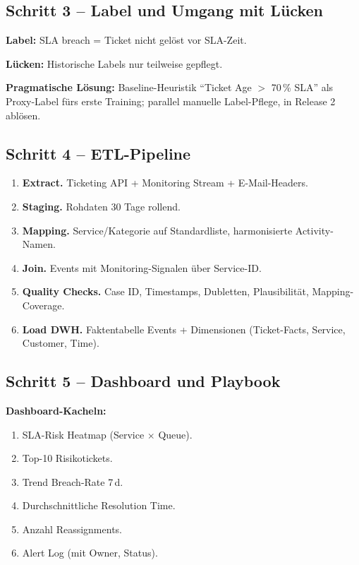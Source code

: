 \documentclass[11pt,a4paper,oneside]{article}
\begin{document}
\subsection{Schritt 3 -- Label und Umgang mit Lücken}

\textbf{Label:} SLA breach = Ticket nicht gelöst vor SLA-Zeit.

\textbf{Lücken:} Historische Labels nur teilweise gepflegt.

\textbf{Pragmatische Lösung:} Baseline-Heuristik ``Ticket Age $>$ 70\,\% SLA'' als Proxy-Label fürs erste Training; parallel manuelle Label-Pflege, in Release 2 ablösen.

\subsection{Schritt 4 -- ETL-Pipeline}

\begin{enumerate}
  \item \textbf{Extract.} Ticketing API + Monitoring Stream + E-Mail-Headers.
  \item \textbf{Staging.} Rohdaten 30 Tage rollend.
  \item \textbf{Mapping.} Service/Kategorie auf Standardliste, harmonisierte Activity-Namen.
  \item \textbf{Join.} Events mit Monitoring-Signalen über Service-ID.
  \item \textbf{Quality Checks.} Case ID, Timestamps, Dubletten, Plausibilität, Mapping-Coverage.
  \item \textbf{Load DWH.} Faktentabelle Events + Dimensionen (Ticket-Facts, Service, Customer, Time).
\end{enumerate}

\subsection{Schritt 5 -- Dashboard und Playbook}

\textbf{Dashboard-Kacheln:}
\begin{enumerate}
  \item SLA-Risk Heatmap (Service $\times$ Queue).
  \item Top-10 Risikotickets.
  \item Trend Breach-Rate 7\,d.
  \item Durchschnittliche Resolution Time.
  \item Anzahl Reassignments.
  \item Alert Log (mit Owner, Status).
\end{enumerate}
\end{document}
